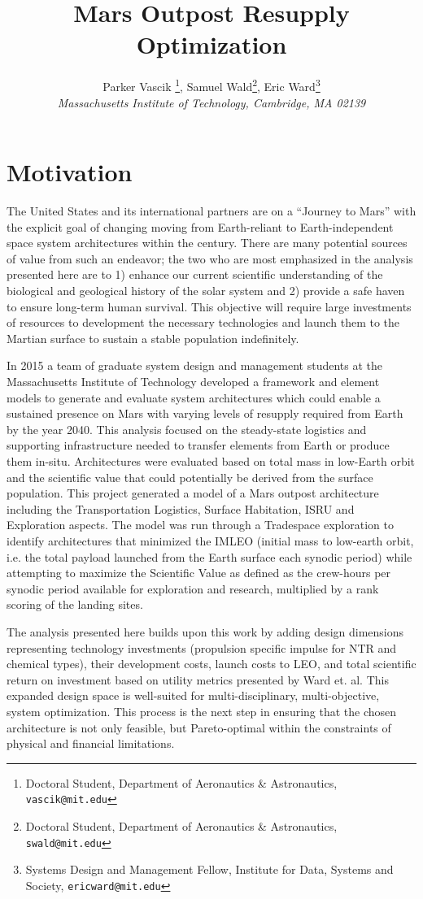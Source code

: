 \documentclass[]{aiaa-pretty}
\author[Vascik, Wald, and Ward]{ %
Parker Vascik \thanks{Doctoral Student, Department of Aeronautics \& Astronautics, \texttt{vascik@mit.edu}},
Samuel Wald\thanks{Doctoral Student, Department of Aeronautics \& Astronautics, \texttt{swald@mit.edu}},
Eric Ward\thanks{Systems Design and Management Fellow, Institute for Data, Systems and Society, \texttt{ericward@mit.edu}}\\
\textit{Massachusetts Institute of Technology, Cambridge, MA 02139}}
\title{Mars Outpost Resupply Optimization}
\begin{document}
\maketitle

\section{Motivation}
\label{sec:Motivation}
The United States and its international partners are on a “Journey to Mars” with the explicit goal of changing moving from Earth-reliant to Earth-independent space system architectures within the century. \cite{craig2015pioneering} There are many potential sources of value from such an endeavor; the two who are most emphasized in the analysis presented here are to 1) enhance our current scientific understanding of the biological and geological history of the solar system and 2) provide a safe haven to ensure long-term human survival. \cite{NRC2014} This objective will require large investments of resources to development the necessary technologies and launch them to the Martian surface to sustain a stable population indefinitely. 

In 2015 a team of graduate system design and management students at the Massachusetts Institute of Technology developed a framework and element models to generate and evaluate system architectures which could enable a sustained presence on Mars with varying levels of resupply required from Earth by the year 2040. This analysis focused on the steady-state logistics and supporting infrastructure needed to transfer elements from Earth or produce them in-situ. Architectures were evaluated based on total mass in low-Earth orbit and the scientific value that could potentially be derived from the surface population. This project generated a model of a Mars outpost architecture including the Transportation Logistics, Surface Habitation, ISRU and Exploration aspects. The model was run through a Tradespace exploration to identify architectures that minimized the IMLEO (initial mass to low-earth orbit, i.e. the total payload launched from the Earth surface each synodic period) while attempting to maximize the Scientific Value as defined as the crew-hours per synodic period available for exploration and research, multiplied by a rank scoring of the landing sites.

The analysis presented here builds upon this work by adding design dimensions representing technology investments (propulsion specific impulse for NTR and chemical types), their development costs, launch costs to LEO, and total scientific return on investment based on utility metrics presented by Ward et. al. \cite{ward2015} This expanded design space is well-suited for multi-disciplinary, multi-objective, system optimization. This process is the next step in ensuring that the chosen architecture is not only feasible, but Pareto-optimal within the constraints of physical and financial limitations. 
\end{document}
